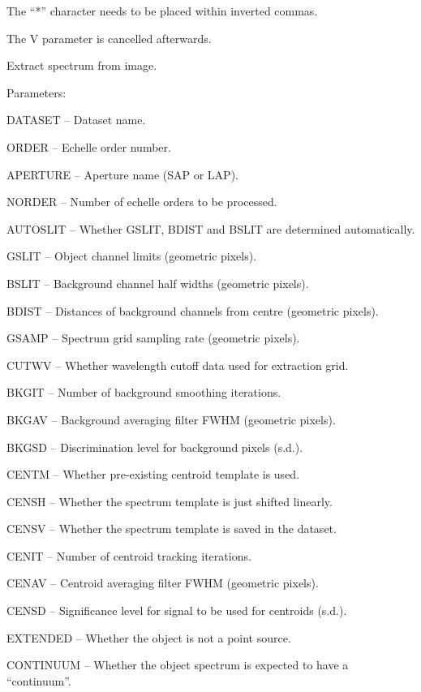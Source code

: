 \begin {description}
\begin {description}
The ``*'' character needs to be placed within inverted commas. 

The V parameter is cancelled afterwards.
\end {description}

\item [TRAK]
Extract spectrum from image.

\begin {description}
\item Parameters:

\begin {description}
\item DATASET -- Dataset name.
\item ORDER -- Echelle order number.
\item APERTURE -- Aperture name (SAP or LAP).
\item NORDER -- Number of echelle orders to be processed.
\item AUTOSLIT -- Whether GSLIT, BDIST and BSLIT are determined automatically.
\item GSLIT -- Object channel limits (geometric pixels).
\item BSLIT -- Background channel half widths (geometric pixels).
\item BDIST -- Distances of background channels from centre (geometric pixels).
\item GSAMP -- Spectrum grid sampling rate (geometric pixels).
\item CUTWV -- Whether wavelength cutoff data used for extraction grid.
\item BKGIT -- Number of background smoothing iterations.
\item BKGAV -- Background averaging filter FWHM (geometric pixels).
\item BKGSD -- Discrimination level for background pixels (s.d.).
\item CENTM -- Whether pre-existing centroid template is used.
\item CENSH -- Whether the spectrum template is just shifted linearly.
\item CENSV -- Whether the spectrum template is saved in the dataset.
\item CENIT -- Number of centroid tracking iterations.
\item CENAV -- Centroid averaging filter FWHM (geometric pixels).
\item CENSD -- Significance level for signal to be used for centroids
(s.d.).
\item EXTENDED -- Whether the object is not a point source.
\item CONTINUUM -- Whether the object spectrum is expected to have a 
``continuum''.
\end {description}


\end{description}
\end{description}
